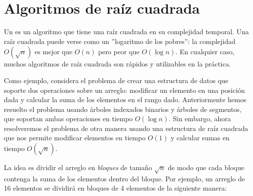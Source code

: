 \chapter{Algoritmos de raíz cuadrada}


Un  es un algoritmo
que tiene una raíz cuadrada en su complejidad temporal.
Una raíz cuadrada puede verse como un ''logaritmo de los pobres'':
la complejidad $O(\sqrt n)$ es mejor que $O(n)$
pero peor que $O(\log n)$.
En cualquier caso, muchos algoritmos de raíz cuadrada son rápidos y utilizables en la práctica.

Como ejemplo, considera el problema de
crear una estructura de datos que soporte
dos operaciones sobre un arreglo:
modificar un elemento en una posición dada
y calcular la suma de los elementos en el rango dado.
Anteriormente hemos resuelto el problema usando
árboles indexados binarios y árboles de segmentos,
que soportan ambas operaciones en tiempo $O(\log n)$.
Sin embargo, ahora resolveremos el problema
de otra manera usando una estructura de raíz cuadrada
que nos permite modificar elementos en tiempo $O(1)$
y calcular sumas en tiempo $O(\sqrt n)$.

La idea es dividir el arreglo en \emph{bloques}
de tamaño $\sqrt n$ de modo que cada bloque contenga
la suma de los elementos dentro del bloque.
Por ejemplo, un arreglo de 16 elementos se
dividirá en bloques de 4 elementos de la siguiente manera:

\begin{center}
\end{center}

